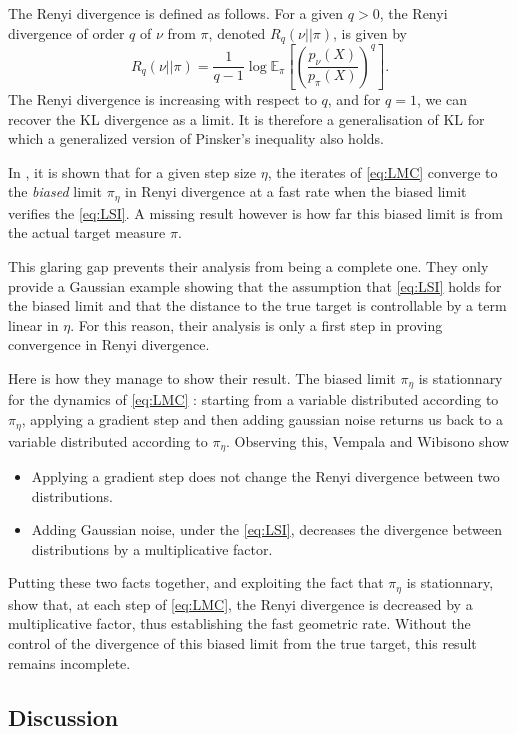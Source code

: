 \documentclass[11pt,twoside]{article}
\theoremstyle{definition}
\newcommand{\E}{\mathbb{E}}
\newcommand{\KL}{\text{KL}}
\begin{document}
The Renyi divergence is defined as follows. For a given $q > 0$, the Renyi divergence of order $q$ of $\nu$ from $\pi$, denoted $R_q(\nu || \pi)$, is given by
\[
R_q(\nu || \pi) = \frac{1}{q-1}\log\E_\pi\left[\left( \frac{p_{\nu}(X)}{p_\pi(X)}\right)^q\right].
\]
The Renyi divergence is increasing with respect to $q$, and for $q=1$, we can recover the $\KL$ divergence as a limit. It is therefore a generalisation of $\KL$ for which a generalized version of Pinsker's inequality also holds.

In \cite{vempala_rapid_2019}, it is shown that for a given step size $\eta$, the iterates of \eqref{eq:LMC} converge to the \textit{biased} limit $\pi_\eta$ in Renyi divergence at a fast rate when the biased limit verifies the \eqref{eq:LSI}. A missing result however is how far this biased limit is from the actual target measure $\pi$.

This glaring gap prevents their analysis from being a complete one. They only provide a Gaussian example showing that the assumption that \eqref{eq:LSI} holds for the biased limit and that the distance to the true target is controllable by a term linear in $\eta$. For this reason, their analysis is only a first step in proving convergence in Renyi divergence.

Here is how they manage to show their result. The biased limit $\pi_\eta$ is stationnary for the dynamics of \eqref{eq:LMC} : starting from a variable distributed according to $\pi_\eta$, applying a gradient step and then adding gaussian noise returns us back to a variable distributed according to $\pi_\eta$. Observing this, Vempala and Wibisono show
\begin{itemize}
\item Applying a gradient step does not change the Renyi divergence between two distributions.
\item Adding Gaussian noise, under the \eqref{eq:LSI}, decreases the divergence between distributions by a multiplicative factor.
\end{itemize}

Putting these two facts together, and exploiting the fact that $\pi_\eta$ is stationnary, \cite{vempala_rapid_2019} show that, at each step of \eqref{eq:LMC}, the Renyi divergence is decreased by a multiplicative factor, thus establishing the fast geometric rate. Without the control of the divergence of this biased limit from the true target, this result remains incomplete.

\subsection{Discussion}
\end{document}
